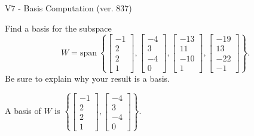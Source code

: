 \begin{exercise}
  \begin{exerciseTitle}V7 - Basis Computation (ver. 837)\end{exerciseTitle}
  \begin{exerciseStatement}
    Find a basis for the subspace 
\[W=\mathrm{span}\ \left\{\left[\begin{array}{r}
-1 \\
2 \\
2 \\
1
\end{array}\right] , \left[\begin{array}{r}
-4 \\
3 \\
-4 \\
0
\end{array}\right] , \left[\begin{array}{r}
-13 \\
11 \\
-10 \\
1
\end{array}\right] , \left[\begin{array}{r}
-19 \\
13 \\
-22 \\
-1
\end{array}\right]\right\}.\]
 Be sure to explain why your result is a basis.


  \end{exerciseStatement}
  \begin{exerciseAnswer}
   A basis of \(W\) is  \(\left\{\left[\begin{array}{r}
-1 \\
2 \\
2 \\
1
\end{array}\right] , \left[\begin{array}{r}
-4 \\
3 \\
-4 \\
0
\end{array}\right]\right\}\).
  


  \end{exerciseAnswer}
\end{exercise}